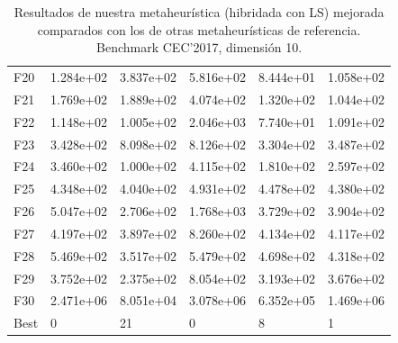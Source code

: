 \documentclass{article}
\begin{document}
\begin{table}[H]
\begin{tabular}{|l|lllll|}
F20  &  1.284e+02 &  3.837e+02 &  5.816e+02 &  8.444e+01 &  1.058e+02 \\
F21  &  1.769e+02 &  1.889e+02 &  4.074e+02 &  1.320e+02 &  1.044e+02 \\
F22  &  1.148e+02 &  1.005e+02 &  2.046e+03 &  7.740e+01 &  1.091e+02 \\
F23  &  3.428e+02 &  8.098e+02 &  8.126e+02 &  3.304e+02 &  3.487e+02 \\
F24  &  3.460e+02 &  1.000e+02 &  4.115e+02 &  1.810e+02 &  2.597e+02 \\
F25  &  4.348e+02 &  4.040e+02 &  4.931e+02 &  4.478e+02 &  4.380e+02 \\
F26  &  5.047e+02 &  2.706e+02 &  1.768e+03 &  3.729e+02 &  3.904e+02 \\
F27  &  4.197e+02 &  3.897e+02 &  8.260e+02 &  4.134e+02 &  4.117e+02 \\
F28  &  5.469e+02 &  3.517e+02 &  5.479e+02 &  4.698e+02 &  4.318e+02 \\
F29  &  3.752e+02 &  2.375e+02 &  8.054e+02 &  3.193e+02 &  3.676e+02 \\
F30  &  2.471e+06 &  8.051e+04 &  3.078e+06 &  6.352e+05 &  1.469e+06 \\\hline
Best &          0 &         21 &          0 &          8 &          1 \\
		\hline
	\end{tabular}
	\caption{Resultados de nuestra metaheurística (hibridada con LS) mejorada comparados con los de otras metaheurísticas de referencia. Benchmark CEC'2017, dimensión 10.}
	\label{tab:hybrid2-10}
\end{table}
\end{document}
